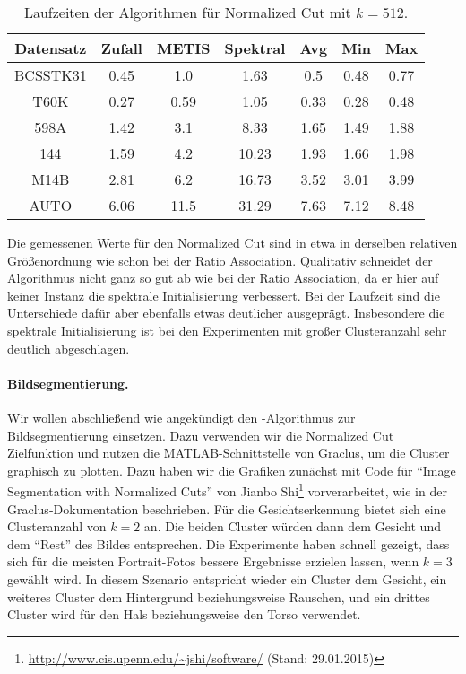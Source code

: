 \begin{table}[h!]
\centering
\begin{tabular}{@{}ccccccc@{}} \toprule
	\textbf{Datensatz} & \textbf{Zufall} & \textbf{METIS} & \textbf{Spektral} & \textbf{Avg} & \textbf{Min} & \textbf{Max} \\ \midrule
	BCSSTK31 	& 0.45 & 1.0 & 1.63 & 0.5 & 0.48 & 0.77 \\
	T60K 		& 0.27 & 0.59 & 1.05 & 0.33 & 0.28 & 0.48 \\
	598A 		& 1.42 & 3.1 & 8.33 & 1.65 & 1.49 & 1.88 \\
	144 		& 1.59 & 4.2 & 10.23 & 1.93 & 1.66 & 1.98 \\
	M14B 		& 2.81 & 6.2 & 16.73 & 3.52 & 3.01 & 3.99 \\
	AUTO 		& 6.06 & 11.5 & 31.29 & 7.63 & 7.12 & 8.48 \\
	\bottomrule
\end{tabular}
\caption{Laufzeiten der Algorithmen für Normalized Cut mit $k = 512$.}
\label{tbl:experiment-experiment-kkmpp-ncut-runtime-512}
\end{table}

Die gemessenen Werte für den Normalized Cut sind in etwa in derselben relativen Größenordnung wie schon bei der 
Ratio Association. Qualitativ schneidet der Algorithmus \kkmpp{} nicht ganz so gut ab wie bei der Ratio Association, da
er hier auf keiner Instanz die spektrale Initialisierung verbessert. Bei der Laufzeit sind die Unterschiede dafür aber ebenfalls
etwas deutlicher ausgeprägt. Insbesondere die spektrale Initialisierung ist bei den Experimenten mit großer Clusteranzahl
sehr deutlich abgeschlagen.
\paragraph{Bildsegmentierung.} Wir wollen abschließend wie angekündigt den \kkmpp-Algorithmus zur Bildsegmentierung einsetzen.
Dazu verwenden wir die Normalized Cut Zielfunktion und nutzen die MATLAB-Schnittstelle von Graclus, um die Cluster
graphisch zu plotten. Dazu haben wir die Grafiken zunächst mit Code für "`Image Segmentation with Normalized Cuts"' von
Jianbo Shi\footnote{\url{http://www.cis.upenn.edu/~jshi/software/} (Stand: 29.01.2015)} vorverarbeitet, wie in der
Graclus-Dokumentation beschrieben. Für die Gesichtserkennung bietet sich eine Clusteranzahl von $k = 2$ an. Die beiden
Cluster würden dann dem Gesicht und dem "`Rest"' des Bildes entsprechen. Die Experimente haben schnell gezeigt, dass sich für
die meisten Portrait-Fotos bessere Ergebnisse erzielen lassen, wenn $k = 3$ gewählt wird. In diesem Szenario entspricht wieder
ein Cluster dem Gesicht, ein weiteres Cluster dem Hintergrund beziehungsweise Rauschen, und ein drittes Cluster wird für
den Hals beziehungsweise den Torso verwendet.


